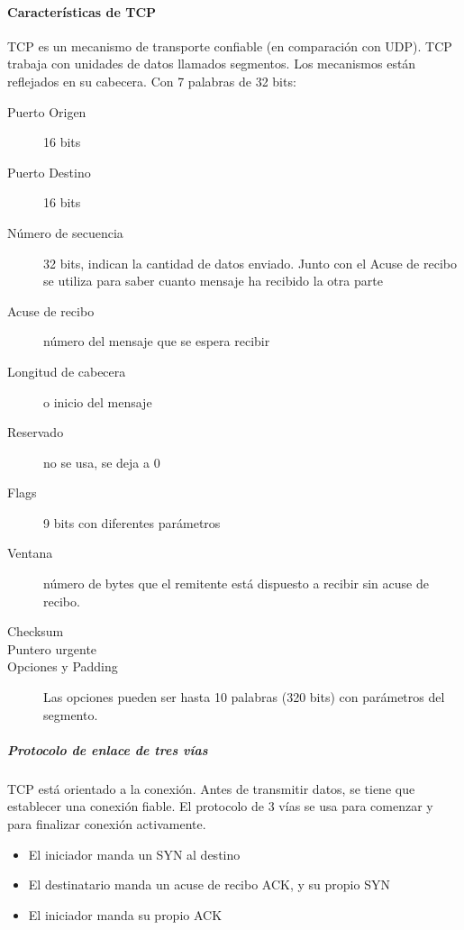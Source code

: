         \paragraph{Características de TCP} %
            TCP es un mecanismo de transporte confiable (en comparación con UDP). TCP trabaja con unidades de datos llamados segmentos. Los mecanismos están reflejados en su cabecera. Con 7 palabras de 32 bits:
            \begin{description}
                \item[Puerto Origen] 16 bits
                \item[Puerto Destino] 16 bits
                \item[Número de secuencia] 32 bits, indican la cantidad de datos enviado. Junto con el Acuse de recibo se utiliza para saber cuanto mensaje ha recibido la otra parte
                \item[Acuse de recibo] número del mensaje que se espera recibir
                \item[Longitud de cabecera] o inicio del mensaje
                \item[Reservado] no se usa, se deja a 0
                \item[Flags] 9 bits con diferentes parámetros
                \item[Ventana] número de bytes que el remitente está dispuesto a recibir sin acuse de recibo.
                \item[Checksum]
                \item[Puntero urgente]
                \item[Opciones y Padding] Las opciones pueden ser hasta 10 palabras (320 bits) con parámetros del segmento.
            \end{description}

            \subparagraph{Protocolo de enlace de tres vías}
                TCP está orientado a la conexión. Antes de transmitir datos, se tiene que establecer una conexión fiable. El protocolo de 3 vías se usa para comenzar y para finalizar conexión activamente.
                \begin{itemize}
                    \item El iniciador manda un SYN al destino
                    \item El destinatario manda un acuse de recibo ACK, y su propio SYN
                    \item El iniciador manda su propio ACK
                \end{itemize}

